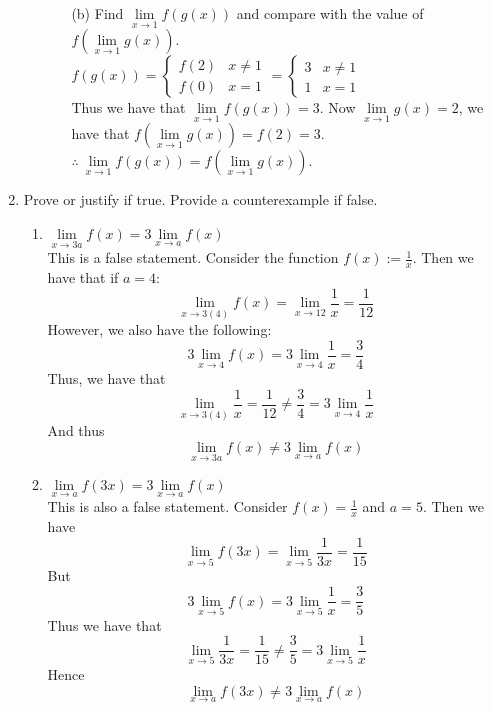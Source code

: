 \documentclass[12pt,letterpaper]{article}
\theoremstyle{case}
\theoremstyle{definition}
\begin{document}
\begin{enumerate}
\begin{enumerate}
\begin{enumerate}
					\item[(b)] Find $\lim\limits_{x \to 1} f(g(x))$ and compare with the value of $f(\lim\limits_{x \to 1} g(x))$.\\
					
					$f(g(x))=\begin{cases}
					f(2) & x \neq 1 \\
					f(0) & x = 1
					\end{cases} = \begin{cases}
					3 & x \neq 1 \\
					1 & x = 1
					\end{cases}$\\
					Thus we have that $\lim\limits_{x \to 1}f(g(x))=3$. Now $\lim\limits_{x \to 1} g(x)=2$, we have that $f(\lim\limits_{x \to 1} g(x))=f(2)=3$.\\
					
					$\therefore\ \lim\limits_{x \to 1}f(g(x))=f(\lim\limits_{x \to 1}g(x))$.
				\end{enumerate}
		\end{enumerate}
	
	\item Prove or justify if true. Provide a counterexample if false.
		\begin{enumerate}
			\item $\lim\limits_{x \to 3a} f(x) = 3 \lim\limits_{x \to a} f(x)$\\
			
			This is a false statement. Consider the function $f(x):=\frac{1}{x}$. Then we have that if $a=4$:
			\[\lim\limits_{x \to 3(4)} f(x) = \lim\limits_{x \to 12} \frac{1}{x} = \frac{1}{12}\]
			However, we also have the following:
			\[3\lim\limits_{x \to 4} f(x) = 3\lim\limits_{x \to 4} \frac{1}{x} = \frac{3}{4}\]
			Thus, we have that
			\[\lim\limits_{x \to 3(4)} \frac{1}{x} = \frac{1}{12} \neq \frac{3}{4} = 3\lim\limits_{x \to 4} \frac{1}{x}\]
			And thus
			\[\lim\limits_{x \to 3a} f(x) \neq 3\lim\limits_{x \to a} f(x)\]
			
			\item $\lim\limits_{x \to a} f(3x) = 3 \lim\limits_{x \to a} f(x)$\\
			
			This is also a false statement. Consider $f(x)=\frac{1}{x}$ and $a=5$. Then we have
			\[\lim\limits_{x \to 5} f(3x) = \lim\limits_{x \to 5} \frac{1}{3x} = \frac{1}{15}\]
			But
			\[3\lim\limits_{x \to 5} f(x) = 3\lim\limits_{x \to 5} \frac{1}{x} = \frac{3}{5}\]
			Thus we have that
			\[\lim\limits_{x \to 5} \frac{1}{3x} = \frac{1}{15} \neq \frac{3}{5} = 3\lim\limits_{x \to 5} \frac{1}{x}\]
			Hence
			\[\lim\limits_{x \to a} f(3x) \neq 3\lim\limits_{x \to a} f(x)\]
			

\end{enumerate}
\end{enumerate}
\end{document}
